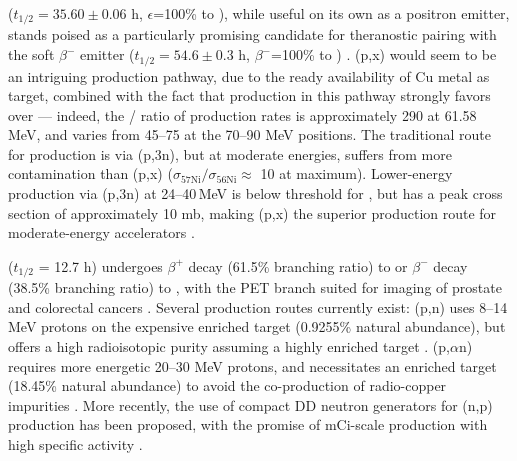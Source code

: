  ($t_{1/2}=35.60\pm0.06$ h, $\epsilon$=100\% to  \cite{Bhat1998}), while useful on its own as a positron emitter, stands poised as a particularly promising candidate for theranostic pairing with the soft $\beta^-$ emitter  ($t_{1/2}=54.6\pm0.3$ h, $\beta^-$=100\% to  \cite{Browne2010a}) \cite{PMID:7632762,zweit1996medium,Graves2016,Rosch2014}. 
(p,x) would seem to be an intriguing production pathway, due to the ready availability of Cu metal as target, combined with the fact that production in this pathway strongly favors  over  --- indeed, the / 
ratio of production rates is approximately 290 at 61.58 MeV, and varies from 45--75 at the 70--90 MeV positions.
The traditional route for  production is via (p,3n), but at moderate energies, suffers from more   contamination than (p,x)  ($\sigma_\text{57Ni} / \sigma_\text{56Ni}\approx$ 10 at maximum).
Lower-energy production via (p,3n) at 24--40\,MeV is below threshold for , but has a peak cross section of approximately 10 mb, making (p,x) the superior production route for moderate-energy accelerators  \cite{MICHEL1997153,Ditrói2013}.


  ($t_{1/2}$ = 12.7 h) undergoes $\beta^+$ decay (61.5\% branching ratio) to  or $\beta^-$ decay (38.5\% branching ratio) to  \cite{Singh2007}, with the 
PET branch 
suited for imaging of prostate and colorectal cancers  
\cite{Lewis2003,Bandari2014,mp500671j}.
Several production routes currently exist: (p,n)  uses 8--14 MeV protons on the expensive enriched target  (0.9255\% natural abundance), but offers a high radioisotopic purity assuming a highly enriched target \cite{Szelecsenyi1993,Aslam2009}.
(p,$\alpha$n) requires more energetic 20--30 MeV protons, and necessitates an enriched target (18.45\% natural abundance) to avoid the co-production of radio-copper impurities \cite{Hilgers2003,Szelecsenyi2005}.
More recently, the use of compact DD neutron generators for (n,p) production has been proposed, with the promise of mCi-scale production with high specific activity  \cite{Voyles2017}.



